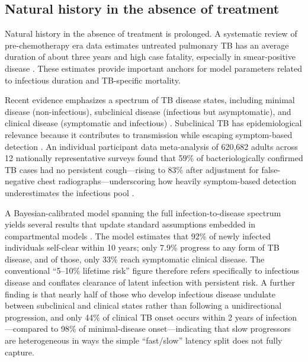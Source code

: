 \documentclass[11pt]{article}
\begin{document}
\subsection{Natural history in the absence of treatment}
Natural history in the absence of treatment is prolonged. A systematic review of pre-chemotherapy era data estimates untreated pulmonary TB has an average duration of about three years and high case fatality, especially in smear-positive disease \citep{tiemersma2011natural}. These estimates provide important anchors for model parameters related to infectious duration and TB-specific mortality.

Recent evidence emphasizes a spectrum of TB disease states, including minimal disease (non-infectious), subclinical disease (infectious but asymptomatic), and clinical disease (symptomatic and infectious) \citep{richards2023spectrum}. Subclinical TB has epidemiological relevance because it contributes to transmission while escaping symptom-based detection \citep{kendall2021subclinical}. An individual participant data meta-analysis of 620{,}682 adults across 12 nationally representative surveys found that 59\% of bacteriologically confirmed TB cases had no persistent cough---rising to 83\% after adjustment for false-negative chest radiographs---underscoring how heavily symptom-based detection underestimates the infectious pool \citep{stuck2024subclinical}.

A Bayesian-calibrated model spanning the full infection-to-disease spectrum yields several results that update standard assumptions embedded in compartmental models \citep{horton2023spectrum}. The model estimates that 92\% of newly infected individuals self-clear within 10 years; only 7.9\% progress to any form of TB disease, and of those, only 33\% reach symptomatic clinical disease. The conventional ``5--10\% lifetime risk'' figure therefore refers specifically to infectious disease and conflates clearance of latent infection with persistent risk. A further finding is that nearly half of those who develop infectious disease undulate between subclinical and clinical states rather than following a unidirectional progression, and only 44\% of clinical TB onset occurs within 2 years of infection---compared to 98\% of minimal-disease onset---indicating that slow progressors are heterogeneous in ways the simple ``fast/slow'' latency split does not fully capture.
\end{document}
